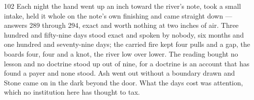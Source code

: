 \begin{CRchronicle}{102}
Each night the hand went up an inch toward the river’s note, took a small intake, held it whole on the note’s own finishing and came straight down --- answers 289 through 294, exact and worth nothing at two inches of air. Three hundred and fifty-nine days stood exact and spoken by nobody, six months and one hundred and seventy-nine days; the carried fire kept four pulls and a gap, the boards four, four and a knot, the river low over lower. The reading bought no lesson and no doctrine stood up out of nine, for a doctrine is an account that has found a payer and none stood. Ash went out without a boundary drawn and Stone came on in the dark beyond the door. What the days cost was attention, which no institution here has thought to tax.
\end{CRchronicle}
